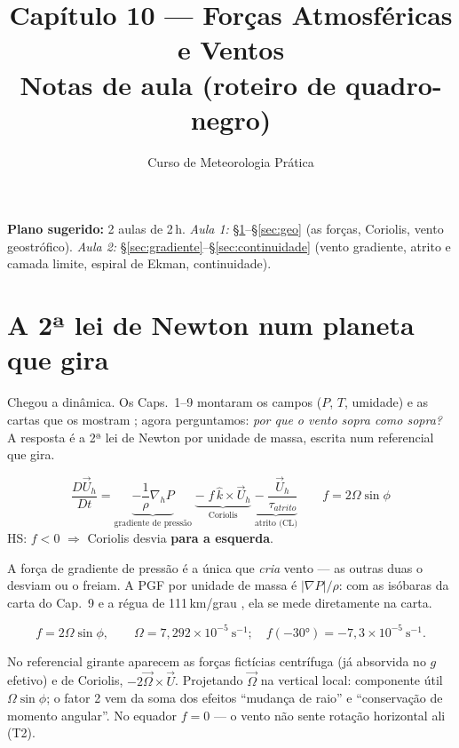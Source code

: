 \documentclass[11pt]{article}
\title{Capítulo 10 --- Forças Atmosféricas e Ventos\\
{\large Notas de aula (roteiro de quadro-negro)}}
\author{Curso de Meteorologia Prática}
\date{}
\begin{document}
\maketitle
\thispagestyle{fancy}

\noindent\textbf{Plano sugerido:} 2 aulas de 2\,h.
\emph{Aula 1:} \S\ref{sec:forcas}--\S\ref{sec:geo} (as forças, Coriolis,
vento geostrófico).
\emph{Aula 2:} \S\ref{sec:gradiente}--\S\ref{sec:continuidade}
(vento gradiente, atrito e camada limite, espiral de Ekman,
continuidade).

\section{A 2ª lei de Newton num planeta que gira}\label{sec:forcas}

Chegou a dinâmica. Os Caps.~1--9 montaram os campos ($P$, $T$, umidade)
e as cartas que os mostram ; agora
perguntamos: \emph{por que o vento sopra como sopra?} A resposta é a 2ª
lei de Newton por unidade de massa, escrita num referencial que gira.

\begin{noquadro}
\[ \frac{D\vec{U}_h}{Dt} =
 \underbrace{-\frac{1}{\rho}\nabla_h P}_{\text{gradiente de pressão}}
 \;\underbrace{-\;f\,\hat{k}\times\vec{U}_h}_{\text{Coriolis}}
 \;\underbrace{-\;\frac{\vec U_h}{\tau_{atrito}}}_{\text{atrito (CL)}}
\qquad f = 2\Omega\sin\phi \]
HS: $f<0$ $\Rightarrow$ Coriolis desvia \textbf{para a esquerda}.
\end{noquadro}


A força de gradiente de pressão é a única que \emph{cria} vento — as
outras duas o desviam ou o freiam. A PGF por unidade de massa é
$|\nabla P|/\rho$: com as isóbaras da carta do Cap.~9 e a régua de
111\,km/grau , ela se mede
diretamente na carta.

\begin{formalivro}
\[ f = 2\Omega\sin\phi,\qquad
\Omega = 7{,}292\times10^{-5}\ \mathrm{s^{-1}};
\quad f(-30°) = -7{,}3\times10^{-5}\ \mathrm{s^{-1}}. \]
\end{formalivro}

\begin{formadif}
No referencial girante aparecem as forças fictícias centrífuga (já
absorvida no $g$ efetivo) e de Coriolis, $-2\vec\Omega\times\vec U$.
Projetando $\vec\Omega$ na vertical local: componente útil
$\Omega\sin\phi$; o fator 2 vem da soma dos efeitos ``mudança de raio''
e ``conservação de momento angular''. No equador $f = 0$ — o vento não
sente rotação horizontal ali (T2).
\end{formadif}
\end{document}
